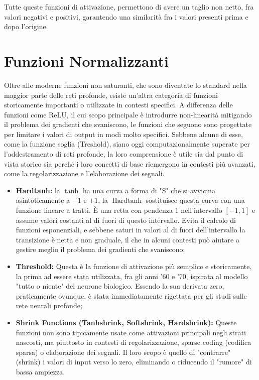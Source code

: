 Tutte queste funzioni di attivazione, permettono di avere un taglio non netto, fra valori negativi e positivi, garantendo una similarità fra i valori presenti prima e dopo l'origine.

\section{Funzioni Normalizzanti}
Oltre alle moderne funzioni non saturanti, che sono diventate lo standard nella maggior parte delle reti profonde, esiste un'altra categoria di funzioni storicamente importanti o utilizzate in contesti specifici. A differenza delle funzioni come ReLU, il cui scopo principale è introdurre non-linearità mitigando il problema dei gradienti che svaniscono, le funzioni che seguono sono progettate per limitare i valori di output in modi molto specifici. Sebbene alcune di esse, come la funzione soglia (Treshold), siano oggi computazionalmente superate per l'addestramento di reti profonde, la loro comprensione è utile sia dal punto di vista storico sia perché i loro concetti di base riemergono in contesti più avanzati, come la regolarizzazione e l'elaborazione dei segnali.

\begin{itemize}
    \item \textbf{Hardtanh:} la $\operatorname{tanh}$ ha una curva a forma di "S" che si avvicina asintoticamente a $-1$ e $+1$, la $\operatorname{Hardtanh}$ sostituisce questa curva con una funzione lineare a tratti. È una retta con pendenza 1 nell'intervallo $[-1, 1]$ e assume valori costanti al di fuori di questo intervallo. Evita il calcolo di funzioni esponenziali, e sebbene saturi in valori al di fuori dell'intervallo la transizione è netta e non graduale, il che in alcuni contesti può aiutare a gestire meglio il problema dei gradienti che svaniscono;
    \item \textbf{Threshold:} Questa è la funzione di attivazione più semplice e storicamente, la prima ad essere stata utilizzata, fra gli anni '60 e '70, ispirata al modello "tutto o niente" del neurone biologico. Essendo la sua derivata zero, praticamente ovunque, è stata immediatamente rigettata per gli studi sulle rete neurali profonde;
    \item \textbf{Shrink Functions (Tanhshrink, Softshrink, Hardshrink):} Queste funzioni non sono tipicamente usate come attivazioni principali negli strati nascosti, ma piuttosto in contesti di regolarizzazione, sparse coding (codifica sparsa) o elaborazione dei segnali. Il loro scopo è quello di "contrarre" (shrink) i valori di input verso lo zero, eliminando o riducendo il "rumore" di bassa ampiezza.
\end{itemize}

